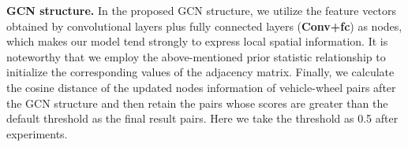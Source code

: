 \documentclass{article}
\begin{document}




\textbf{GCN structure.} In the proposed GCN structure, we utilize the feature vectors obtained by convolutional layers plus fully connected layers (\textbf{Conv+fc}) as nodes, which makes our model tend strongly to express local spatial information. It is noteworthy that we employ the above-mentioned prior statistic relationship to initialize the corresponding values of the adjacency matrix. Finally, we calculate the cosine distance of the updated nodes information of vehicle-wheel pairs after the GCN structure and then retain the pairs whose scores are greater than the default threshold as the final result pairs. Here we take the threshold as 0.5 after experiments.



\end{document}
